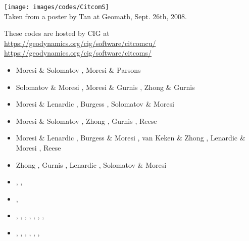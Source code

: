 \begin{itemize}
\begin{center}
\texttt{[image: images/codes/CitcomS]}\\
{\captionfont Taken from a poster by Tan \etal at Geomath, Sept. 26th, 2008.}
\end{center}

These codes are hosted by CIG at\\
\url{https://geodynamics.org/cig/software/citcomcu/}  \\
\url{https://geodynamics.org/cig/software/citcoms/}

\begin{scriptsize}
\begin{itemize}
\item[\nineteenninetyfive] Moresi \& Solomatov \cite{moso95}, Moresi \& Parsons \cite{mopa95}
\item[\nineteenninetysix] Solomatov \& Moresi \cite{somo96}, Moresi \& Gurnis \cite{mogu96}, 
                    Zhong \& Gurnis \cite{zhgu96}
\item[\nineteenninetyseven] Moresi \& Lenardic \cite{mole97}, Burgess \etal \cite{bugm97}, 
                    Solomatov \& Moresi \cite{somo97}
\item[\nineteenninetyeight] Moresi \& Solomatov \cite{moso98}, Zhong \etal \cite{zhgm98}, 
                    Gurnis \etal \cite{gumm98}, Reese \etal \cite{resm98}
\item[\nineteenninetynine] Moresi \& Lenardic \cite{mole99}, Burgess \& Moresi \cite{bumo99}, 
                    van Keken \& Zhong \cite{vazh99}, Lenardic \& Moresi \cite{lemo99}, 
                    Reese \etal \cite{resm99}
\item[\twothousand] Zhong \etal \cite{zhzm00}, Gurnis \etal \cite{gumr00,gumm00},
                    Lenardic \etal \cite{lemm00}, Solomatov \& Moresi \cite{somo00}
\item[\twothousandone]       \textcite{bigu01},  \textcite{lemo01}, \textcite{zhon01}
\item[\twothousandtwo]       \textcite{tagh02},  \textcite{somo02}
\item[\twothousandthree]     \textcite{vazh03},  \textcite{cogu03},
                             \textcite{bigu03},  \textcite{lemm03},  \textcite{vesh03},
                             \textcite{lemo03},  \textcite{bigs03}, 
\item[\twothousandfour]      \textcite{keso04},  \textcite{solo04},
                             \textcite{frmm04},  \textcite{lenm04},
                             \textcite{colm04},  \textcite{mczh04}, 

\end{itemize}
\end{scriptsize}
\end{itemize}
